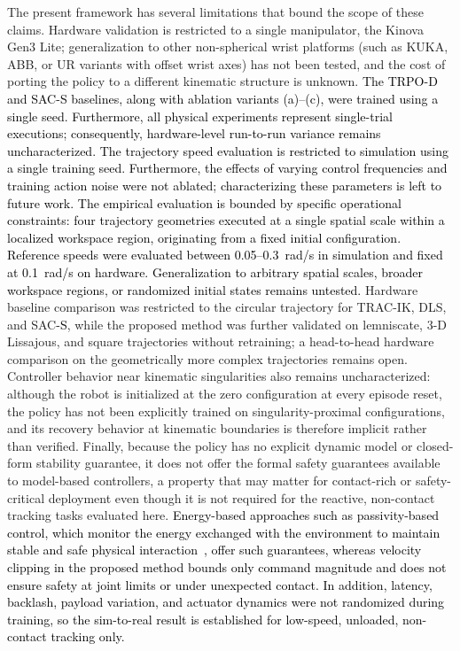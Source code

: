 \documentclass[preprint,12pt]{elsarticle}
\begin{document}
The present framework has several limitations that bound the scope of
these claims. Hardware validation is restricted to a single manipulator,
the Kinova Gen3 Lite; generalization to other non-spherical wrist platforms
(such as KUKA, ABB, or UR variants with offset wrist axes) has not been
tested, and the cost of porting the policy to a different kinematic
structure is unknown. \textcolor{black}{The TRPO-D and SAC-S baselines, along with ablation variants (a)--(c), were trained using a single seed. Furthermore, all physical experiments represent single-trial executions; consequently, hardware-level run-to-run variance remains uncharacterized.} \textcolor{black}{The trajectory speed evaluation is restricted to simulation using a single training seed. Furthermore, the effects of varying control frequencies and training action noise were not ablated; characterizing these parameters is left to future work.} \textcolor{black}{The empirical evaluation is bounded by specific operational constraints: four trajectory geometries executed at a single spatial scale within a localized workspace region, originating from a fixed initial configuration. Reference speeds were evaluated between 0.05--0.3~rad/s in simulation and fixed at 0.1~rad/s on hardware. Generalization to arbitrary spatial scales, broader workspace regions, or randomized initial states remains untested.} Hardware baseline comparison was restricted to the circular trajectory for TRAC-IK, DLS, and SAC\textcolor{black}{-S}, while the proposed method was further validated on lemniscate, 3-D Lissajous, and square trajectories without retraining; a head-to-head hardware comparison on the geometrically more complex trajectories remains open. Controller behavior near kinematic singularities also remains uncharacterized: although the robot is initialized at the zero configuration at every episode reset, the policy has not been explicitly trained on singularity-proximal configurations, and its recovery behavior at kinematic boundaries is therefore implicit rather than verified. Finally, because the policy has no explicit dynamic model or closed-form stability guarantee, it does not offer the formal safety guarantees available to model-based controllers, a property that may matter for contact-rich or safety-critical deployment even though it is not required for the reactive, non-contact tracking tasks evaluated here. \textcolor{black}{Energy-based approaches such as passivity-based control, which monitor the energy exchanged with the environment to maintain stable and safe physical interaction~\cite{khan2025quantum}, offer such guarantees, whereas velocity clipping in the proposed method bounds only command magnitude and does not ensure safety at joint limits or under unexpected contact. In addition, latency, backlash, payload variation, and actuator dynamics were not randomized during training, so the sim-to-real result is established for low-speed, unloaded, non-contact tracking only.}
\end{document}
